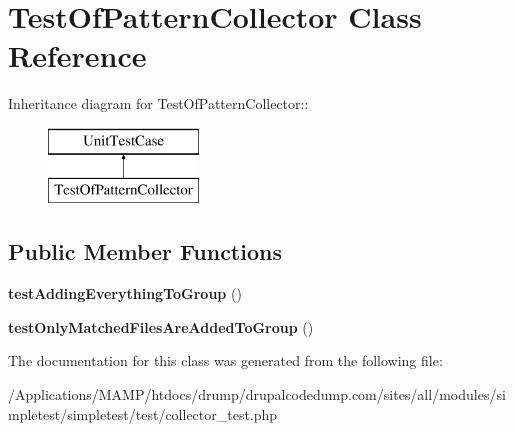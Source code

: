 \hypertarget{class_test_of_pattern_collector}{
\section{TestOfPatternCollector Class Reference}
\label{class_test_of_pattern_collector}
}
Inheritance diagram for TestOfPatternCollector::\begin{figure}[H]
\begin{center}
\leavevmode
\includegraphics[height=2cm]{class_test_of_pattern_collector}
\end{center}
\end{figure}
\subsection*{Public Member Functions}
\begin{DoxyCompactItemize}
\item 
\hypertarget{class_test_of_pattern_collector_adedc87b20105e6f03777fb3df5250068}{
{\bfseries testAddingEverythingToGroup} ()}
\label{class_test_of_pattern_collector_adedc87b20105e6f03777fb3df5250068}

\item 
\hypertarget{class_test_of_pattern_collector_a9c9c6dcaebfb871f7082c6a4600915c3}{
{\bfseries testOnlyMatchedFilesAreAddedToGroup} ()}
\label{class_test_of_pattern_collector_a9c9c6dcaebfb871f7082c6a4600915c3}

\end{DoxyCompactItemize}


The documentation for this class was generated from the following file:\begin{DoxyCompactItemize}
\item 
/Applications/MAMP/htdocs/drump/drupalcodedump.com/sites/all/modules/simpletest/simpletest/test/collector\_\-test.php\end{DoxyCompactItemize}
